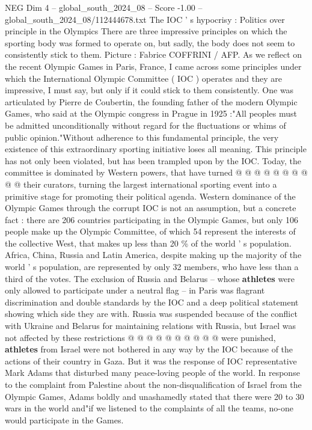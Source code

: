 \begin{textsample}{NEG Dim 4 – global\_south\_2024\_08 – Score -1.00 – global\_south\_2024\_08/112444678.txt}  \label{ex:f4_neg_331}
The IOC ' s hypocrisy : Politics over principle in the Olympics There are three impressive principles on which the sporting body was formed to operate on, but sadly, the body does not seem to consistently stick to them.
Picture : Fabrice COFFRINI / AFP.
As we reflect on the recent Olympic Games in Paris, France, I came across some principles under which the International Olympic Committee ( IOC ) operates and they are impressive, I must say, but only if it could stick to them consistently.
One was articulated by Pierre de Coubertin, the founding father of the modern Olympic Games, who said at the Olympic congress in Prague in 1925 :"All peoples must be admitted unconditionally without regard for the fluctuations or whims of public opinion."Without adherence to this fundamental principle, the very existence of this extraordinary sporting initiative loses all meaning.
This principle has not only been violated, but has been trampled upon by the IOC.
Today, the committee is dominated by Western powers, that have turned @ @ @ @ @ @ @ @ @ @ their curators, turning the largest international sporting event into a primitive stage for promoting their political agenda.
Western dominance of the Olympic Games through the corrupt IOC is not an assumption, but a concrete fact : there are 206 countries participating in the Olympic Games, but only 106 people make up the Olympic Committee, of which 54 represent the interests of the collective West, that makes up less than 20 \% of the world ' s population.
Africa, China, Russia and Latin America, despite making up the majority of the world ' s population, are represented by only 32 members, who have less than a third of the votes.
The exclusion of Russia and Belarus -- whose \textbf{athletes} were only allowed to participate under a neutral flag -- in Paris was flagrant discrimination and double standards by the IOC and a deep political statement showing which side they are with.
Russia was suspended because of the conflict with Ukraine and Belarus for maintaining relations with Russia, but Israel was not affected by these restrictions @ @ @ @ @ @ @ @ @ @ were punished, \textbf{athletes} from Israel were not bothered in any way by the IOC because of the actions of their country in Gaza.
But it was the response of IOC representative Mark Adams that disturbed many peace-loving people of the world.
In response to the complaint from Palestine about the non-disqualification of Israel from the Olympic Games, Adams boldly and unashamedly stated that there were 20 to 30 wars in the world and"if we listened to the complaints of all the teams, no-one would participate in the Games.

\end{textsample}
